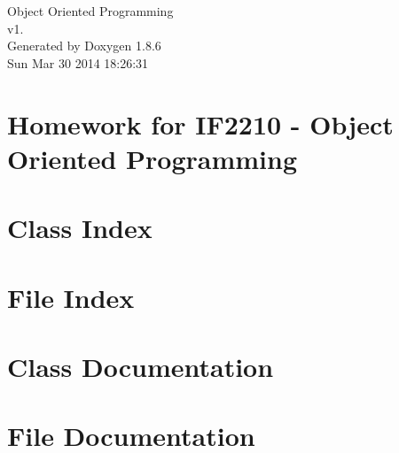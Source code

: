 \documentclass[twoside]{book}
\newcommand{\clearemptydoublepage}{%
  \newpage{\pagestyle{empty}\cleardoublepage}%
}
\begin{document}
\hypersetup{pageanchor=false}
\begin{titlepage}
\vspace*{7cm}
\begin{center}%
{\Large Object Oriented Programming \\[1ex]\large v1. }\\
\vspace*{1cm}
{\large Generated by Doxygen 1.8.6}\\
\vspace*{0.5cm}
{\small Sun Mar 30 2014 18:26:31}\\
\end{center}
\end{titlepage}
\clearemptydoublepage
\tableofcontents
\clearemptydoublepage
{}
\hypersetup{pageanchor=true}

\chapter{Homework for I\-F2210 -\/ Object Oriented Programming}
\label{index}\hypertarget{index}{}
\chapter{Class Index}

\chapter{File Index}

\chapter{Class Documentation}






\chapter{File Documentation}





















\newpage
{}
{}
\printindex
\end{document}
